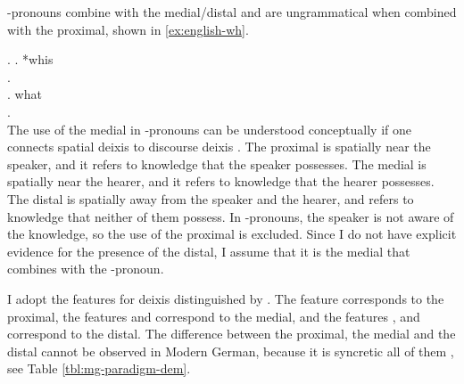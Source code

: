 -pronouns combine with the medial/distal and are ungrammatical when combined with the proximal, shown in \ref{ex:english-wh}.

\ex.\label{ex:english-wh}
 \ag. *whis\\
 .\\
 \bg. what\\
 .\\

The use of the medial in -pronouns can be understood conceptually if one connects spatial deixis to discourse deixis \citep[cf.][]{colasanti2019}. The proximal is spatially near the speaker, and it refers to knowledge that the speaker possesses. The medial is spatially near the hearer, and it refers to knowledge that the hearer possesses. The distal is spatially away from the speaker and the hearer, and refers to knowledge that neither of them possess. In -pronouns, the speaker is not aware of the knowledge, so the use of the proximal is excluded. Since I do not have explicit evidence for the presence of the distal, I assume that it is the medial that combines with the -pronoun.

I adopt the features for deixis distinguished by \citet{lander2018}. The feature  corresponds to the proximal, the features  and  correspond to the medial, and the features ,  and  correspond to the distal.
The difference between the proximal, the medial and the distal cannot be observed in Modern German, because it is syncretic all of them , see Table \ref{tbl:mg-paradigm-dem}.


